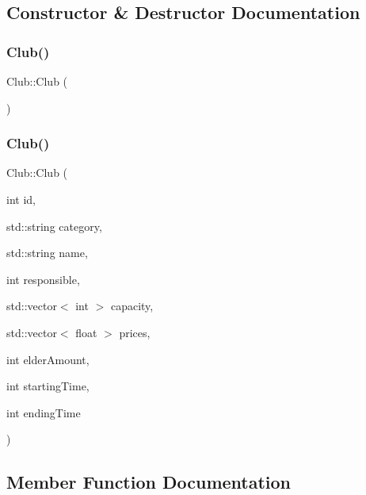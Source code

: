 \subsection{Constructor \& Destructor Documentation}
\mbox{\label{class_club_a0c3852dcc026792a5b3df86ac3cde541}} 
\subsubsection{\texorpdfstring{Club()}{Club()}\hspace{0.1cm}{\footnotesize\ttfamily [1/2]}}
{\footnotesize\ttfamily Club\+::\+Club (\begin{DoxyParamCaption}{ }\end{DoxyParamCaption})}

\mbox{\label{class_club_a5b5602cb997e5c431840dda3ce9dad8d}} 
\subsubsection{\texorpdfstring{Club()}{Club()}\hspace{0.1cm}{\footnotesize\ttfamily [2/2]}}
{\footnotesize\ttfamily Club\+::\+Club (\begin{DoxyParamCaption}\item[{int}]{id,  }\item[{std\+::string}]{category,  }\item[{std\+::string}]{name,  }\item[{int}]{responsible,  }\item[{std\+::vector$<$ int $>$}]{capacity,  }\item[{std\+::vector$<$ float $>$}]{prices,  }\item[{int}]{elder\+Amount,  }\item[{int}]{starting\+Time,  }\item[{int}]{ending\+Time }\end{DoxyParamCaption})}



\subsection{Member Function Documentation}
\mbox{\label{class_club_a3dfbcb50e77a48ae0f510f6ff7b7734c}} 
